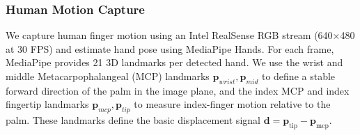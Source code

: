 \documentclass[letterpaper, 10 pt, conference]{ieeeconf}  %
\newcommand{\algname}{SOFTMAP\xspace}
\begin{document}

\subsubsection{Human Motion Capture}
We capture human finger motion using an Intel RealSense RGB stream (640×480 at 30 FPS) and estimate hand pose using MediaPipe Hands. For each frame, MediaPipe provides 21 3D landmarks per detected hand. We use the wrist and middle Metacarpophalangeal (MCP) landmarks $\mathbf{p}_{wrist}, \mathbf{p}_{mid}$ to define a stable forward direction of the palm in the image plane, and the index MCP and index fingertip landmarks $\mathbf{p}_{mcp}, \mathbf{p}_{tip}$ to measure index-finger motion relative to the palm. These landmarks define the basic displacement signal $\mathbf{d}=\mathbf{p}_{\mathrm{tip}}-\mathbf{p}_{\mathrm{mcp}}$.
\end{document}
